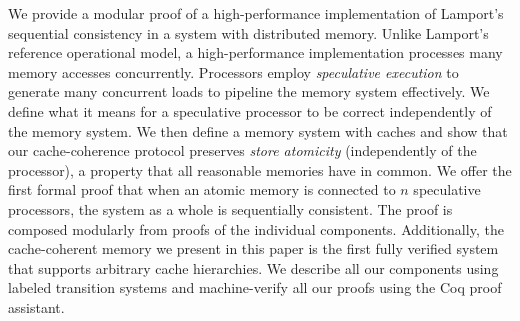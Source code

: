 We provide a modular proof of a high-performance implementation of Lamport's
sequential consistency in a system with distributed memory. Unlike
Lamport's reference operational model, a high-performance implementation
processes many memory accesses concurrently. Processors employ
\emph{speculative execution} to generate many concurrent loads to pipeline the
memory system effectively. We define what it means for a speculative processor
to be correct independently of the memory system. We then define a memory
system with caches and show that our cache-coherence protocol preserves
\emph{store atomicity} (independently of the processor), a property that all
reasonable memories have in common.  We offer the first formal proof that when
an atomic memory is connected to $n$ speculative processors, the system as a
whole is sequentially consistent. The proof is composed modularly from proofs
of the individual components. Additionally, the cache-coherent memory we
present in this paper is the first fully verified system that supports
arbitrary cache hierarchies. We describe all our components using labeled
transition systems and machine-verify all our proofs using the Coq proof
assistant.

